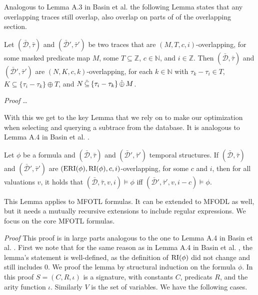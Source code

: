 Analogous to Lemma A.3 in Basin et al. \cite{Basin2016} the following Lemma states that any overlapping traces still overlap, also overlap on parts of of the overlapping section.
\begin{lemma}
    \label{lem:eri-overlap-transitivity}
    Let $(\bar{\mathcal{D}}, \bar{\tau})$ and $(\bar{\mathcal{D}}', \bar{\tau}')$ be two traces that are $(M,T,c,i)$-overlapping, for some masked predicate map $M$, some $T \subseteq \mathbb{Z}$, $c \in \mathbb{N}$, and $i \in \mathbb{Z}$.
    Then $(\bar{\mathcal{D}}, \bar{\tau})$ and $(\bar{\mathcal{D}}', \bar{\tau}')$ are $(N, K, c, k)$-overlapping, for each $k \in \mathbb{N}$ with $\tau_k - \tau_i \in T$, $K \subseteq \{ \tau_i - \tau_k \} \oplus T$, and $N \,\ddot{\subseteq}\, \{ \tau_i - \tau_k \} \,\dot{\oplus}\, M$.
\end{lemma}
\textit{Proof} 
\dots

With this we get to the key Lemma that we rely on to make our optimization when selecting and querying a subtrace from the database.
It is analogous to Lemma A.4 in Basin et al. \cite{Basin2016}.

\begin{lemma}
    \label{lem:eri-overlap}
    Let $\phi$ be a formula and $(\bar{\mathcal{D}}, \bar{\tau})$ and $(\bar{\mathcal{D}}', \bar{\tau}')$ temporal structures.
    If $(\bar{\mathcal{D}}, \bar{\tau})$ and $(\bar{\mathcal{D}}', \bar{\tau}')$ are $(\operatorname{ERI}(\phi), \operatorname{RI}(\phi), c, i)$-overlapping, for some $c$ and $i$, then for all valuations $v$, it holds that $(\bar{\mathcal{D}},\bar{\tau},v,i) \models \phi$ iff $(\bar{\mathcal{D}}', \bar{\tau}', v, i-c) \models \phi$.
\end{lemma}
This Lemma applies to MFOTL formulas.
It can be extended to MFODL as well, but it needs a mutually recursive extensions to include regular expressions.
We focus on the core MFOTL formulas.

\textit{Proof} This proof is in large parts analogous to the one to Lemma A.4 in Basin et al. \cite{Basin2016}. First we note that for the same reason as in Lemma A.4 in Basin et al. \cite{Basin2016}, the lemma's statement is well-defined, as the definition of $\operatorname{RI}(\phi)$ did not change and still includes $0$.
We proof the lemma by structural induction on the formula $\phi$.
In this proof $S = (C, R, \iota)$ is a signature, with constants $C$, predicats $R$, and the arity function $\iota$.
Similarly $V$ is the set of variables.
We have the following cases.

